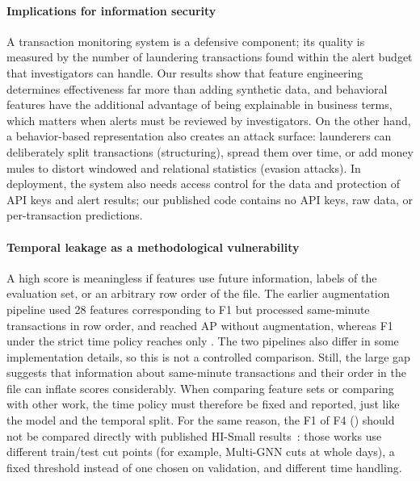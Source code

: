 \documentclass[sigconf,nonacm]{acmart}
\begin{document}
\paragraph{Implications for information security} A transaction monitoring system is a defensive component; its
quality is measured by the number of laundering transactions found within the alert budget that investigators can
handle. Our results show that feature engineering determines effectiveness far more than adding synthetic data, and
behavioral features have the additional advantage of being explainable in business terms, which matters when alerts
must be reviewed by investigators. On the other hand, a behavior-based representation also creates an attack surface:
launderers can deliberately split transactions (structuring), spread them over time, or add money mules to distort
windowed and relational statistics (evasion attacks). In deployment, the system also needs access control for the
data and protection of API keys and alert results; our published code contains no API keys, raw data, or
per-transaction predictions.

\paragraph{Temporal leakage as a methodological vulnerability} A high score is meaningless if features use future
information, labels of the evaluation set, or an arbitrary row order of the file. The earlier augmentation pipeline
used 28 features corresponding to F1 but processed same-minute transactions in row order, and reached AP \EZeroAP{}
without augmentation, whereas F1 under the strict time policy reaches only \FOneAP. The two pipelines also differ in
some implementation details, so this is not a controlled comparison. Still, the large gap suggests that information
about same-minute transactions and their order in the file can inflate scores considerably. When comparing feature
sets or comparing with other work, the time policy must therefore be fixed and reported, just like the model and the
temporal split. For the same reason, the F1 of F4 (\FFourFone) should not be compared directly with published HI-Small
results~\cite{blanusa2024gfp,egressy2024multignn}: those works use different train/test cut points (for example,
Multi-GNN cuts at whole days), a fixed threshold instead of one chosen on validation, and different time handling.
\end{document}
